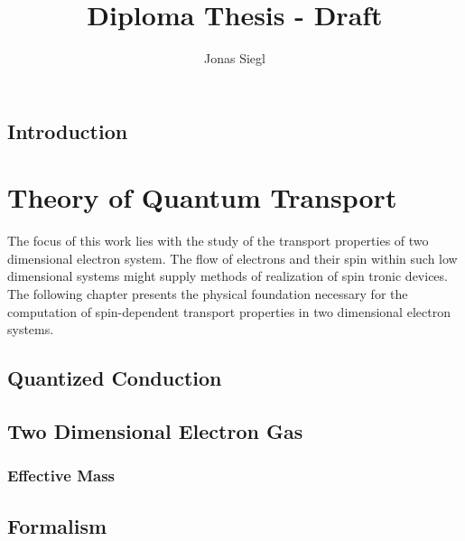 
\author{Jonas Siegl}
\title{Diploma Thesis - Draft}




\maketitle
% 

\pagestyle{plain} %
\tableofcontents
\clearpage
\section*{Introduction}
\clearpage
\pagestyle{main}
\chapter{Theory of Quantum Transport}
The focus of this work lies with the study of the transport properties of two dimensional electron system. The flow of electrons and their spin within such low dimensional systems might supply methods of realization of spin tronic devices.
 The following chapter presents the physical foundation necessary for the computation of spin-dependent transport properties in two dimensional electron systems.
  \section{Quantized Conduction}
  
  \section{Two Dimensional Electron Gas}
    
      \subsection{Effective Mass \hamil{}}
	
	
  \section{\cgfnc{} Formalism}
  
